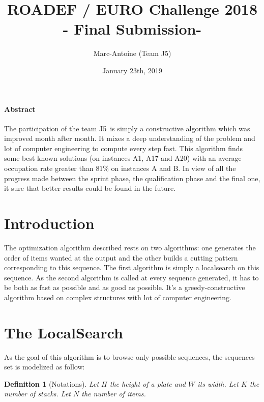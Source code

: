 \documentclass{article}
\title{ROADEF / EURO Challenge 2018 \\
    - Final Submission-}
\date{January 23th, 2019}
\author{Marc-Antoine \bsc{Augé} (Team J5)}
\newtheorem{definition}{Definition}
\begin{document}
        \maketitle

\paragraph{Abstract}
The participation of the team J5 is simply a constructive algorithm which was improved month after month. It mixes a deep understanding of the problem and lot of computer engineering to compute every step fast. This algorithm finds some best known solutions (on instances A1, A17 and A20) with an average occupation rate greater than $81\%$ on instances A and B. In view of all the progress made between the sprint phase, the qualification phase and the final one, it sure that better results could be found in the future.

\section{Introduction}

The optimization algorithm described rests on two algorithms: one generates the order of items wanted at the output and the other builds a cutting pattern corresponding to this sequence. The first algorithm is simply a localsearch on this sequence. As the second algorithm is called at every sequence generated, it has to be both as fast as possible and as good as possible. It's a greedy-constructive algorithm based on complex structures with lot of computer engineering.

\section{The LocalSearch}

As the goal of this algorithm is to browse only possible sequences, the sequences set is modelized as follow:

\begin{definition}[Notations]
    Let $H$ the height of a plate and $W$ its width. 
    Let $K$ the number of stacks. 
    Let $N$ the number of items.
\end{definition}
\end{document}
